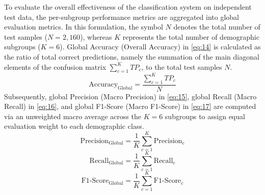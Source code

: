 To evaluate the overall effectiveness of the classification system on independent test data, the per-subgroup performance metrics are aggregated into global evaluation metrics. In this formulation, the symbol $N$ denotes the total number of test samples ($N=2,160$), whereas $K$ represents the total number of demographic subgroups ($K=6$). Global Accuracy (Overall Accuracy) in \eqref{eq:14} is calculated as the ratio of total correct predictions, namely the summation of the main diagonal elements of the confusion matrix $\sum_{c=1}^K TP_c$, to the total test samples $N$.
\begin{equation}
\text{Accuracy}_{\text{Global}} = \frac{\sum_{c=1}^K TP_c}{N}
\label{eq:14}
\end{equation}
Subsequently, global Precision (Macro Precision) in \eqref{eq:15}, global Recall (Macro Recall) in \eqref{eq:16}, and global F1-Score (Macro F1-Score) in \eqref{eq:17} are computed via an unweighted macro average across the $K=6$ subgroups to assign equal evaluation weight to each demographic class.
\begin{equation}
\text{Precision}_{\text{Global}} = \frac{1}{K} \sum_{c=1}^K \text{Precision}_c
\label{eq:15}
\end{equation}
\begin{equation}
\text{Recall}_{\text{Global}} = \frac{1}{K} \sum_{c=1}^K \text{Recall}_c
\label{eq:16}
\end{equation}
\begin{equation}
\text{F1-Score}_{\text{Global}} = \frac{1}{K} \sum_{c=1}^K \text{F1-Score}_c
\label{eq:17}
\end{equation}
